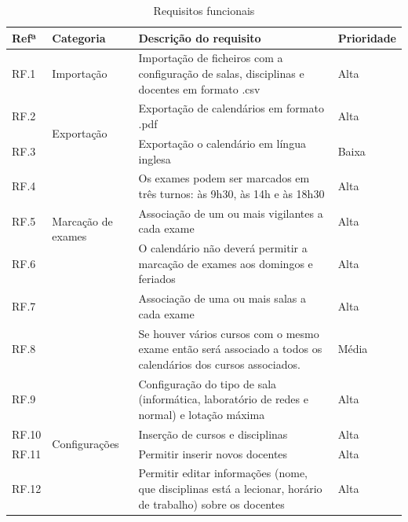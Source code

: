 \documentclass[11pt, twoside]{report}
\begin{document}
\def\arraystretch{1.5}
	\begin{center}
		\label{requisitiosfuncionais}
		\begin{longtable}{|m{1cm}|m{2.2cm}|m{10cm}|m{2cm}|}
			\caption{Requisitos funcionais}\\
			
			\hline			
			\textbf{Refª }	& \textbf{Categoria}&\textbf{Descrição do requisito} & \textbf{Prioridade} \\
			\hline
			
			
			RF.1 &Importação& Importação de ficheiros com a configuração de salas, disciplinas e docentes em formato .csv & Alta \\
			\hline
			
			RF.2 &\multirow{2}{2cm}{Exportação}& Exportação de calendários em formato .pdf & Alta \\
			
			RF.3 && Exportação o calendário em língua inglesa & Baixa \\
			\hline
			
			RF.4 &\multirow{3}{2cm}{Marcação de exames}& Os exames podem ser marcados em três turnos: às 9h30, às 14h e às 18h30 & Alta \\
			
			RF.5 && Associação de um ou mais vigilantes a cada exame & Alta \\
			
			RF.6 && O calendário não deverá permitir a marcação de exames aos domingos e feriados & Alta \\
			
			RF.7 &&	Associação de uma ou mais salas a cada exame & Alta\\
			
			RF.8 && Se houver vários cursos com o mesmo exame então será associado a todos os calendários dos cursos associados. & Média\\
			\hline
		
			RF.9 &\multirow{7}{2cm}{Configurações}& Configuração do tipo de sala (informática, laboratório de redes e normal) e lotação máxima & Alta \\
			
			RF.10 & & Inserção de cursos e disciplinas & Alta\\
			
			RF.11 && Permitir inserir novos docentes & Alta\\
			
			RF.12 && Permitir editar informações (nome, que disciplinas está a lecionar, horário de trabalho) sobre os docentes & Alta\\
			

\end{longtable}
\end{center}
\end{document}
